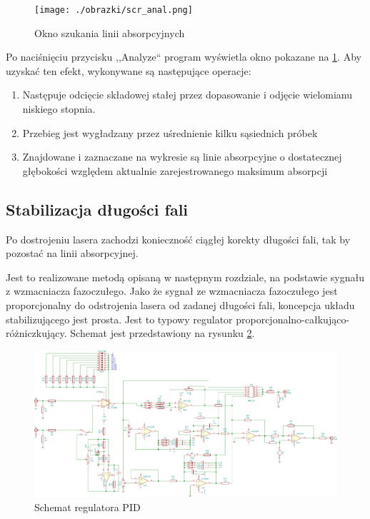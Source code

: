\documentclass[a4paper,10pt]{article}
\begin{document}
\begin{figure}
\begin{center}
 \texttt{[image: ./obrazki/scr\_anal.png]}
\end{center}
\caption{Okno szukania linii absorpcyjnych}
\label{scr-anal}
\end{figure}

Po naciśnięciu przycisku ,,Analyze`` program wyświetla okno pokazane na \ref{scr-anal}.
Aby uzyskać ten efekt, wykonywane są następujące operacje:
\begin{enumerate}
 \item Następuje odcięcie składowej stałej przez dopasowanie i odjęcie wielomianu niskiego stopnia.
 \item Przebieg jest wygładzany przez uśrednienie kilku sąsiednich próbek
 \item Znajdowane i zaznaczane na wykresie są linie absorpcyjne o dostatecznej głębokości względem aktualnie zarejestrowanego maksimum absorpcji
\end{enumerate}





\subsection{Stabilizacja długości fali}

Po dostrojeniu lasera zachodzi konieczność ciągłej korekty długości fali, tak by pozostać na linii absorpcyjnej.

Jest to realizowane metodą opisaną w następnym rozdziale, na podstawie sygnału z wzmacniacza fazoczułego. %
Jako że sygnał ze wzmacniacza fazoczułego jest proporcjonalny do odstrojenia lasera od zadanej długości fali, koncepcja układu stabilizującego jest prosta.
Jest to typowy regulator proporcjonalno-całkująco-różniczkujący. Schemat jest przedstawiony na rysunku \ref{sch-pid}.

\begin{figure}
\begin{center}
 \includegraphics[scale=0.58, angle =90 ]{./obrazki/pidella.pdf}
\end{center}
\caption{Schemat regulatora PID}
\label{sch-pid}
\end{figure}
\end{document}
